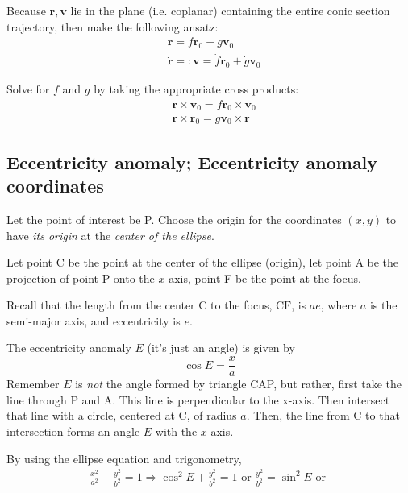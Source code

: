 \documentclass[10pt]{amsart}
\begin{document}
\begin{multicols*}{2}
Because $\mathbf{r}, \mathbf{v}$ lie in the plane (i.e. coplanar) containing the entire conic section trajectory, then make the following ansatz:
\begin{equation}
\begin{aligned}
& \mathbf{r} = f\mathbf{r}_0 + g \mathbf{v}_0 \\ 
& \dot{\mathbf{r}} =: \mathbf{v} = \dot{f} \mathbf{r}_0 + \dot{g} \mathbf{v}_0
\end{aligned} 
\end{equation}

Solve for $f$ and $g$ by taking the appropriate cross products:
\begin{equation}\label{Eq:fAndgSeparatedByCrossProducts}
\begin{aligned} 
	& \mathbf{r} \times \mathbf{v}_0 = f\mathbf{r}_0 \times \mathbf{v}_0 \\ 
	& \mathbf{r} \times \mathbf{r}_0 = g \mathbf{v}_0 \times \mathbf{r} 
\end{aligned}
\end{equation}

\subsection{Eccentricity anomaly; Eccentricity anomaly coordinates}

Let the point of interest be P. Choose the origin for the coordinates $(x, y)$ to have \emph{its origin} at the \emph{center of the ellipse}. %

Let point C be the point at the center of the ellipse (origin), let point A be the projection of point P onto the $x$-axis, point F be the point at the focus.

Recall that the length from the center C to the focus, $\overline{\text{CF}}$, is $ae$, where $a$ is the semi-major axis, and eccentricity is $e$. 

The eccentricity anomaly $E$ (it's just an angle) is given by
\begin{equation}
\cos{E} = \frac{x}{a}
\end{equation}
Remember $E$ is \emph{not} the angle formed by triangle CAP, but rather, first take the line through P and A. This line is perpendicular to the x-axis. Then intersect that line with a circle, centered at C, of radius $a$. Then, the line from C to that intersection forms an angle $E$ with the $x$-axis.

By using the ellipse equation and trigonometry,
\[
\begin{gathered}
	\frac{x^2}{a^2} + \frac{y^2}{b^2} = 1 \Longrightarrow \cos^2{E}  + \frac{y^2}{b^2} = 1 \text{ or } \frac{y^2}{b^2} = \sin^2{E} \text{ or } 
\end{gathered}
\]


\end{multicols*}
\end{document}
